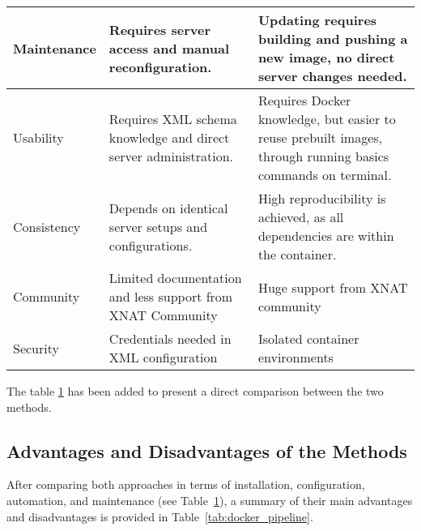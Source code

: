\begin{table}[H]
\begin{tabular}{|>{\centering\arraybackslash}p{4cm}|
                    >{\centering\arraybackslash}p{5cm}|
                    >{\centering\arraybackslash}p{5cm}|}
Maintenance & Requires server access and manual reconfiguration.& Updating requires building and pushing a new image, no direct server changes needed.\\ \hline
Usability& Requires XML schema knowledge and direct server administration.& Requires Docker knowledge, but easier to reuse prebuilt images, through running basics commands on terminal.\\ \hline
Consistency& Depends on identical server setups and configurations.& High reproducibility is achieved, as all dependencies are within the container.\\ \hline
Community& Limited documentation and less support from XNAT Community& Huge support from XNAT community\\ \hline
Security& Credentials needed in XML configuration& Isolated container environments\\ \hline
    \end{tabular}
    \label{tab:pipeline-vs-docker}
\end{table}







 The table \ref{tab:pipeline-vs-docker} has been added to present a direct comparison between the two methods.







 
 \subsection{Advantages and Disadvantages of the Methods}

After comparing both approaches in terms of installation, configuration, automation, and maintenance (see Table~\ref{tab:pipeline-vs-docker}), a summary of their main advantages and disadvantages is provided in Table~\ref{tab:docker_pipeline}.

